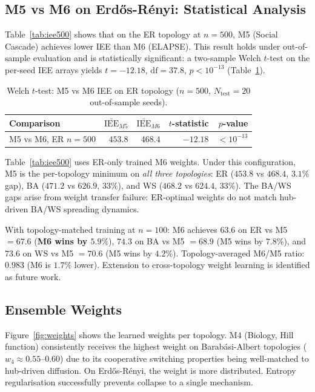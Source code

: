\documentclass[review,12pt]{elsarticle}
\begin{document}
\subsection{M5 vs M6 on Erd\H{o}s-R\'enyi: Statistical Analysis}
\label{sec:iee_comparison}

Table~\ref{tab:iee500} shows that on the ER topology at $n=500$, M5
(Social Cascade) achieves lower IEE than M6 (ELAPSE). This result holds
under out-of-sample evaluation and is statistically significant: a
two-sample Welch $t$-test on the per-seed IEE arrays yields
$t = -12.18$, $\mathrm{df} = 37.8$, $p < 10^{-13}$ (Table~\ref{tab:ttest}).

\begin{table}[htbp]
  \caption{Welch $t$-test: M5 vs M6 IEE on ER topology ($n=500$,
           $N_{\mathrm{test}}=20$ out-of-sample seeds).}
  \label{tab:ttest}
  \centering
  \small
  \begin{tabular}{lrrrr}
    \toprule
    Comparison & $\bar{\mathrm{IEE}}_{M5}$ & $\bar{\mathrm{IEE}}_{M6}$
               & $t$-statistic & $p$-value \\
    \midrule
    M5 vs M6, ER $n=500$ & $453.8$ & $468.4$ & $-12.18$ & $<10^{-13}$ \\
    \bottomrule
  \end{tabular}
\end{table}

Table~\ref{tab:iee500} uses ER-only trained M6 weights.  Under this
configuration, M5 is the per-topology minimum on \emph{all three topologies}:
ER ($453.8$ vs $468.4$, $3.1\%$ gap), BA ($471.2$ vs $626.9$, $33\%$), and
WS ($468.2$ vs $624.4$, $33\%$).  The BA/WS gaps arise from weight transfer
failure: ER-optimal weights do not match hub-driven BA/WS spreading dynamics.

With topology-matched training at $n=100$: M6 achieves $63.6$ on ER vs M5
$=67.6$ (\textbf{M6 wins by $5.9\%$}), $74.3$ on BA vs M5 $=68.9$ (M5 wins
by $7.8\%$), and $73.6$ on WS vs M5 $=70.6$ (M5 wins by $4.2\%$).
Topology-averaged M6/M5 ratio: $0.983$ (M6 is $1.7\%$ lower).  Extension to
cross-topology weight learning is identified as future work.

\subsection{Ensemble Weights}

Figure~\ref{fig:weights} shows the learned weights per topology. M4
(Biology, Hill function) consistently receives the highest weight on
Barab\'asi-Albert topologies ($w_4 \approx 0.55$--$0.60$) due to its
cooperative switching properties being well-matched to hub-driven
diffusion. On Erd\H{o}s-R\'enyi, the weight is more distributed.
Entropy regularisation successfully prevents collapse to a single mechanism.
\end{document}
